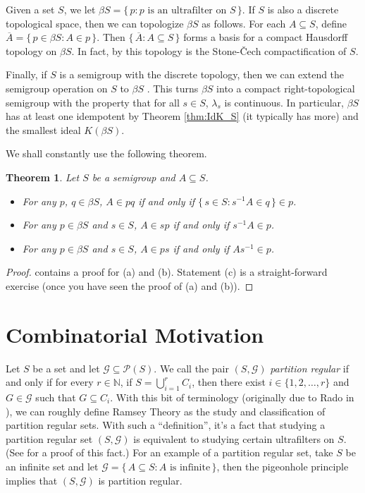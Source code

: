 \documentclass[12pt]{article}
\theoremstyle{plain}
\newtheorem{thm}{Theorem}[section]
\theoremstyle{definition}
\newcommand{\bbN}{\mathbb{N}}
\newcommand{\calG}{\mathcal{G}}
\newcommand{\calP}{\mathcal{P}}
\begin{document}
Given a set $S$, we let $\beta S = \{\, p : \mbox{$p$ is an
  ultrafilter on $S$} \,\}$.
If $S$ is also a discrete topological space, then we can topologize
$\beta S$ as follows. 
For each $A \subseteq S$, define $\overline{A} = \{\, p \in \beta S :
A \in p \,\}$. 
Then $\{\, \overline{A} : A \subseteq S \,\}$ forms a basis for a
compact Hausdorff
topology on $\beta S$.
In fact, by \cite[Theorem 3.27]{Hindman:1998fk} this topology is the
Stone-\v{C}ech compactification of $S$. 

Finally, if $S$ is a semigroup with the discrete topology, then we can
extend the semigroup operation on $S$ to $\beta S$ \cite[Theorem
4.1]{Hindman:1998fk}.
This turns $\beta S$ into a compact right-topological semigroup with
the property that for all $s \in S$, $\lambda_s$ is continuous. 
In particular, $\beta S$ has at least one idempotent by Theorem
\ref{thm:IdK_S} (it typically has more) and the smallest ideal
$K(\beta S)$.

We shall constantly use the following theorem.
\begin{thm}
  Let $S$ be a semigroup and $A \subseteq S$.
  \begin{itemize}
    \item[(a)] For any $p$, $q \in \beta S$, $A \in pq$ if and only if
      $\{\, s \in S : s^{-1}A \in q \,\} \in p$. 
    
    \item[(b)] For any $p \in \beta S$ and $s \in S$, $A \in sp$ if
      and only if $s^{-1}A \in p$.

    \item[(c)] For any $p \in \beta S$ and $s \in S$, $A \in ps$ if
      and only if $As^{-1} \in p$.
  \end{itemize}
\end{thm}
\begin{proof}
  \cite[Theorem 4.12]{Hindman:1998fk} contains a proof for (a) and
  (b).
  Statement (c) is a straight-forward exercise (once you have seen the
  proof of (a) and (b)).
\end{proof}

\section{Combinatorial Motivation} 
Let $S$ be a set and let $\calG \subseteq \calP(S)$.
We call the pair $(S, \calG)$ \textsl{partition regular} if and only
if for every $r \in \bbN$, if $S = \bigcup_{i=1}^r C_i$, then there
exist $i \in \{1, 2, \ldots, r\}$ and $G \in \calG$ such that $G
\subseteq C_i$. 
With this bit of terminology (originally due to Rado in
\cite{Rado:1945kx}), we can roughly define Ramsey Theory as the
  study and classification of partition regular sets. 
With such a ``definition'', it's a fact that studying a partition
regular set $(S, \calG)$ is equivalent to studying certain ultrafilters on
$S$. 
(See \cite[Theorem 5.7]{Hindman:1998fk} for a proof of this fact.)
For an example of a partition regular set, take $S$ be an infinite set
and let $\calG = \{\, A \subseteq S : \mbox{$A$ is infinite} \,\}$, then the
pigeonhole principle implies that $(S, \calG)$ is partition regular.
\end{document}
